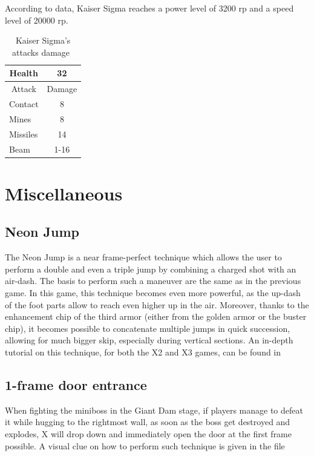 According to data, Kaiser Sigma reaches a power level of 3200 rp and a speed level of 20000 rp.

\begin{table}[htp]
	\centering
	\begin{tabular}[h]{l c}
		\toprule
		\multicolumn{1}{c}{Health}  & 32 \\
		\midrule
		\multicolumn{1}{c}{Attack} & \multicolumn{1}{c}{Damage}\\
		Contact & 8 \\
		Mines& 8\\
		Missiles & 14\\
		Beam& 1-16\\ 
		\bottomrule
	\end{tabular}
	\caption{Kaiser Sigma's attacks damage~\cite{wiki:Sigma3,book:Compendium}}
\end{table}

\chapter{Miscellaneous}\label{X3:misc} %
\section{Neon Jump}\label{x3-neon}
The Neon Jump is a near frame-perfect technique which allows the user to perform a double and even a triple jump by combining a charged shot with an air-dash. The basis to perform such a maneuver are the same as in the previous game. In this game, this technique becomes even more powerful, as the up-dash of the foot parts allow to reach even higher up in the air. Moreover, thanks to the enhancement chip of the third armor (either from the golden armor or the buster chip), it becomes possible to concatenate multiple jumps in quick succession, allowing for much bigger skip, especially during vertical sections.
An in-depth tutorial on this technique, for both the X2 and X3 games, can be found in \cite{video:Neon}

\section{1-frame door entrance}
When fighting the miniboss in the Giant Dam stage, if players manage to defeat it while hugging to the rightmost wall, as soon as the boss get destroyed and explodes, X will drop down and immediately open the door at the first frame possible. A visual clue on how to perform such technique is given in the file 

